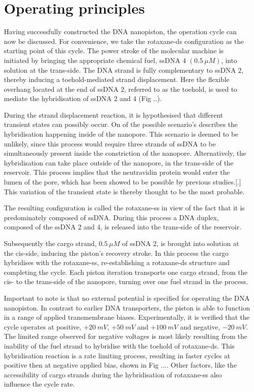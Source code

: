 \section{Operating principles}

Having successfully constructed the DNA nanopiston, the operation cycle can now be
discussed. For convenience, we take the rotaxane-ds configuration as the starting point
of this cycle. The power stroke of the molecular machine is initiated by bringing the
appropriate chemical fuel, ssDNA $4$ $(0.5\ \mu M)$, into solution at the trans-side. The
DNA strand is fully complementary to ssDNA $2$, thereby inducing a toehold-mediated
strand displacement. Here the flexible overhang located at the end of ssDNA $2$, referred
to as the toehold, is used to mediate the hybridisation of ssDNA $2$ and $4$ (Fig ..).

During the strand displacement reaction, it is hypothesised that different transient
states can possibly occur. On of the possible scenario's describes the hybridisation
happening inside of the nanopore. This scenario is deemed to be unlikely, since this
process would require three strands of ssDNA to be simultaneously present inside the
constriction of the nanopore. Alternatively, the hybridisation can take place outside of
the nanopore, in the trans-side of the reservoir. This process implies that the
neutravidin protein would enter the lumen of the pore, which has been showed to be
possible by previous studies.[.] This variation of the transient state is thereby
thought to be the most probable.

The resulting configuration is called the rotaxane-ss in view of the fact that it is
predominately composed of ssDNA. During this process a DNA duplex, composed of the ssDNA
2 and 4, is released into the trans-side of the reservoir.

Subsequently the cargo strand, $0.5\ \mu M$ of ssDNA $2$,  is brought into solution at
the cis-side, inducing the piston's recovery stroke. In this process the cargo hybridises
with the rotaxane-ss, re-establishing a rotaxane-ds structure and completing the cycle.
Each piston iteration transports one cargo strand, from the cis- to the trans-side of
the nanopore, turning over one fuel strand in the process.

Important to note is that no external potential is specified for operating the DNA
nanopiston. In contrast to earlier DNA transporters, the piston is able to function in a
range of applied transmembrane biases. Experimentally, it is verified that the
cycle operates at positive, $+20\ mV$, $+50\ mV$ and $+100\ mV$ and negative, $ - 20\
mV$. The limited range observed for negative voltages is most likely resulting from the
inability of the fuel strand to hybridise with the toehold of rotaxane-ds. This
hybridisation reaction is a rate limiting process, resulting in faster cycles at positive
then at negative applied bias, shown in Fig .... Other factors, like the accessibility of
cargo strands during the hybridisation of rotaxane-ss also influence the cycle rate.

